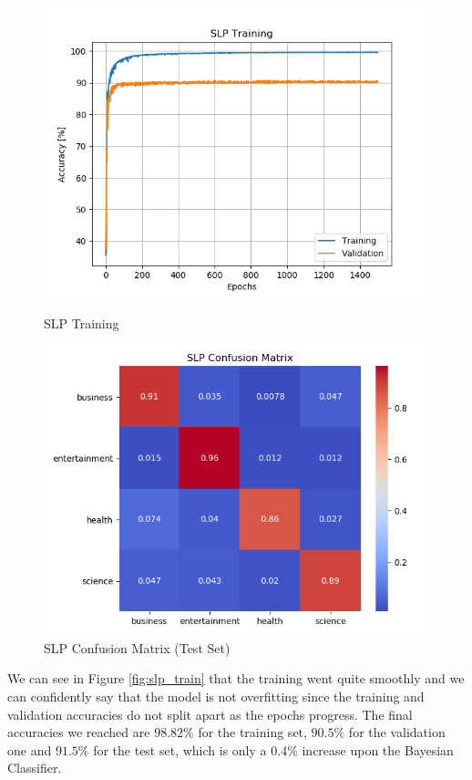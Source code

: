\documentclass[10pt,a4paper]{report}
\begin{document}
\begin{figure}
    \centering
    \begin{minipage}{0.45\textwidth}
        \centering
        \includegraphics[width=\textwidth]{slp_training.png} %
        \caption{SLP Training}
        \label{fig:slp_train}
    \end{minipage}\hfill
    \begin{minipage}{0.45\textwidth}
        \centering
        \includegraphics[width=\textwidth]{slp_confmat.png} %
        \caption{SLP Confusion Matrix (Test Set)}
        \label{fig:slp_confmat}
    \end{minipage}
\end{figure}
We can see in Figure \ref{fig:slp_train} that the training went quite smoothly and we can confidently say that the model is not overfitting since the training and validation accuracies do not split apart as the epochs progress. The final accuracies we reached are $98.82 \%$ for the training set, $90.5 \%$ for the validation one and $91.5 \%$ for the test set, which is only a $0.4 \%$ increase upon the Bayesian Classifier.  
\end{document}
